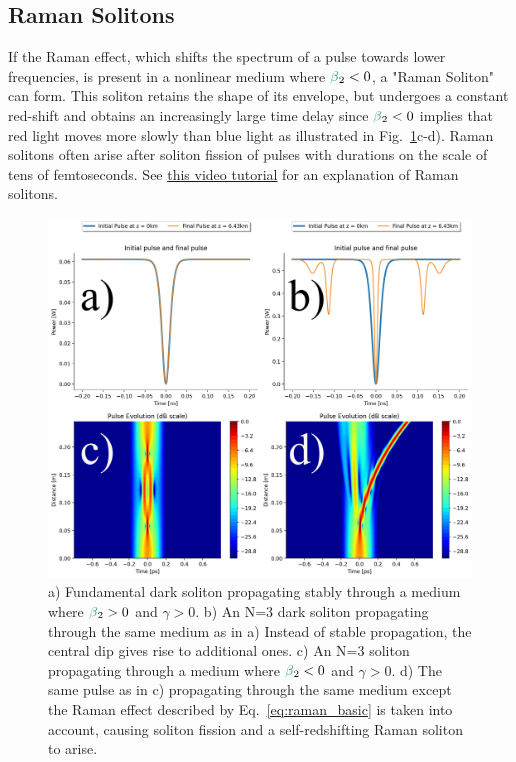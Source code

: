 \subsection{Raman Solitons}
If the Raman effect, which shifts the spectrum of a pulse towards lower frequencies, is present in a nonlinear medium where $\betag_2<0$, a "Raman Soliton" can form. This soliton retains the shape of its envelope, but undergoes a constant red-shift and obtains an increasingly large time delay since $\betag_2<0$ implies that red light moves more slowly than blue light as illustrated in Fig.~\ref{fig:dark_and_raman}c-d). Raman solitons often arise after soliton fission of pulses with durations on the scale of tens of femtoseconds. See \href{https://www.youtube.com/watch?v=K33YUfegL1w}{this video tutorial} for an explanation of Raman solitons.

\begin{figure}
    \centering
    \includegraphics[width=1\linewidth]{figures/dark_and_raman_soliton_combined.png}
    \caption{a) Fundamental dark soliton propagating stably through a medium where $\betag_2>0$ and $\gamma>0$. b) An N=3 dark soliton propagating through the same medium as in a) Instead of stable propagation, the central dip gives rise to additional ones. c) An N=3 soliton propagating through a medium where $\betag_2<0$ and $\gamma>0$. d) The same pulse as in c) propagating through the same medium except the Raman effect described by Eq.~\ref{eq:raman_basic} is taken into account, causing soliton fission and a self-redshifting Raman soliton to arise.  }
    \label{fig:dark_and_raman}
\end{figure}

